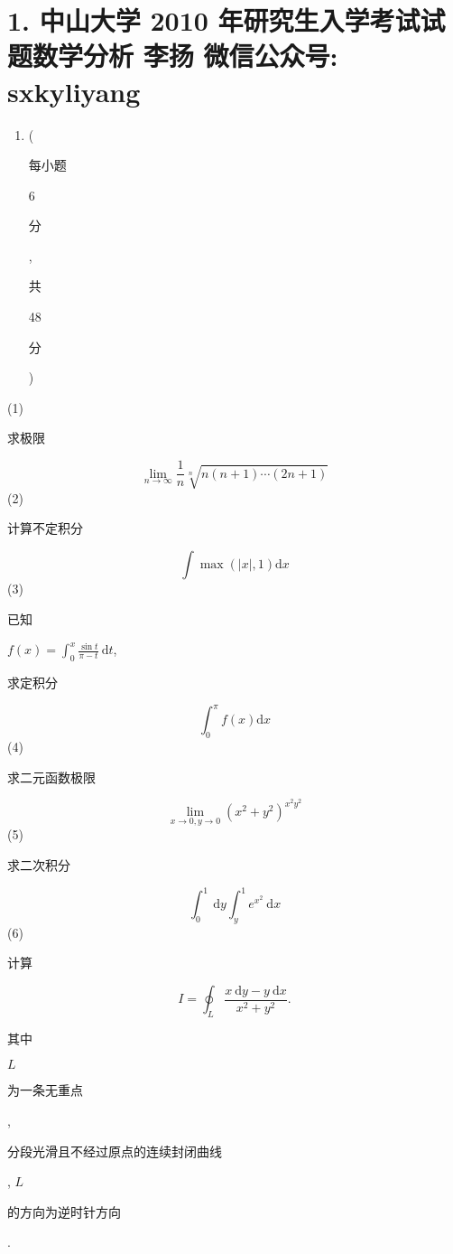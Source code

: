 \documentclass[10pt]{article}
\begin{document}
\section{1. 中山大学 2010 年研究生入学考试试题数学分析 
 李扬 
 微信公众号: sxkyliyang}
\begin{enumerate}
  \item (\begin{CJK}{UTF8}{mj}每小题\end{CJK} 6 \begin{CJK}{UTF8}{mj}分\end{CJK}, \begin{CJK}{UTF8}{mj}共\end{CJK} 48 \begin{CJK}{UTF8}{mj}分\end{CJK})
\end{enumerate}
(1) \begin{CJK}{UTF8}{mj}求极限\end{CJK}
$$
\lim _{n \rightarrow \infty} \frac{1}{n} \sqrt[n]{n(n+1) \cdots(2 n+1)}
$$
(2) \begin{CJK}{UTF8}{mj}计算不定积分\end{CJK}
$$
\int \max (|x|, 1) \mathrm{d} x
$$
(3) \begin{CJK}{UTF8}{mj}已知\end{CJK} $f(x)=\int_{0}^{x} \frac{\sin t}{\pi-t} \mathrm{~d} t$, \begin{CJK}{UTF8}{mj}求定积分\end{CJK}
$$
\int_{0}^{\pi} f(x) \mathrm{d} x
$$
(4) \begin{CJK}{UTF8}{mj}求二元函数极限\end{CJK}
$$
\lim _{x \rightarrow 0, y \rightarrow 0}\left(x^{2}+y^{2}\right)^{x^{2} y^{2}}
$$
(5) \begin{CJK}{UTF8}{mj}求二次积分\end{CJK}
$$
\int_{0}^{1} \mathrm{~d} y \int_{y}^{1} e^{x^{2}} \mathrm{~d} x
$$
(6) \begin{CJK}{UTF8}{mj}计算\end{CJK}
$$
I=\oint_{L} \frac{x \mathrm{~d} y-y \mathrm{~d} x}{x^{2}+y^{2}} .
$$
\begin{CJK}{UTF8}{mj}其中\end{CJK} $L$ \begin{CJK}{UTF8}{mj}为一条无重点\end{CJK}, \begin{CJK}{UTF8}{mj}分段光滑且不经过原点的连续封闭曲线\end{CJK}, $L$ \begin{CJK}{UTF8}{mj}的方向为逆时针方向\end{CJK}.
\end{document}
